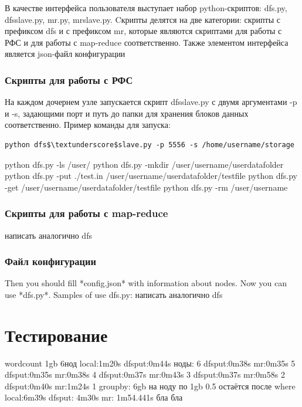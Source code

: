 \documentclass[12pt,a4paper,oneside]{extarticle}
\begin{document}
        В качестве интерфейса пользователя выступает набор python-скриптов: dfs.py, dfs\textunderscore slave.py, mr.py, mr\textunderscore slave.py.
        Cкрипты делятся на две категории: скрипты с префиксом dfs и с префиксом mr, которые являются скриптами для работы с РФС и для работы с map-reduce соответственно.
        Также элементом интерфейса является json-файл конфигурации

        \subsubsection{Скрипты для работы с РФС}
            На каждом дочернем узле запускается скрипт dfs\textunderscore slave.py с двумя аргументами -p и -s, задающими порт и путь до папки для хранения блоков данных соответственно.
            Пример команды для запуска:
            \lstset{}
            \begin{lstlisting}[mathescape] 
    python dfs$\textunderscore$slave.py -p 5556 -s /home/username/storage
            \end{lstlisting}
            


                


            


                python dfs.py -ls /user/
                python dfs.py -mkdir /user/username/userdatafolder
                python dfs.py -put ./test.in /user/username/userdatafolder/testfile
                python dfs.py -get /user/username/userdatafolder/testfile
                python dfs.py -rm /user/username
        \subsubsection{Скрипты для работы с map-reduce}
            написать аналогично dfs

        \subsubsection{Файл конфигурации}
        Then you should fill *config.json* with information about nodes. Now you can use *dfs.py*. Samples of use dfs.py:
            написать аналогично dfs
    \clearpage  


\clearpage

\section{Тестирование}
\label{sec:tests}
    wordcount
	1gb 6нод
        local:1m20s
        dfsput:0m44s
        ноды:
        6
		dfsput:0m38s
		mr:0m35s
	5
		dfsput:0m35s
		mr:0m38s
	4
		dfsput:0m37s
		mr:0m43s
	3
		dfsput:0m37s
		mr:0m58s
	2
		dfsput:0m40s
		mr:1m24s
	1
    groupby:
	6gb
	на ноду по 1gb
	0.5 остаётся после where
        local:6m39s
        dfsput: 4m30s
        mr: 1m54.441s
    бла бла
        
\end{document}
